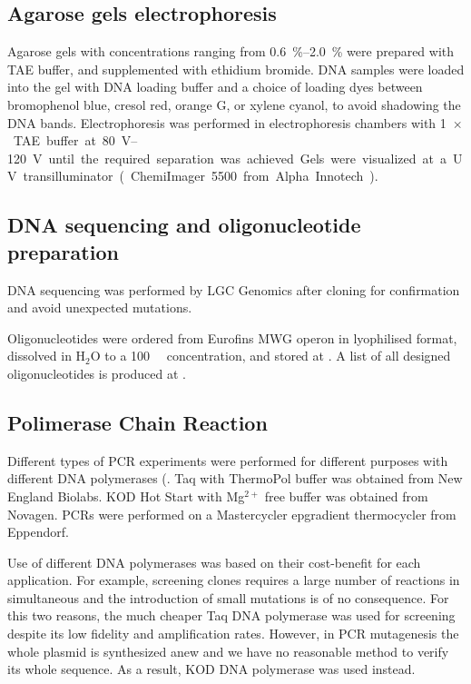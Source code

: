   \subsection{Agarose gels electrophoresis}
    Agarose gels with concentrations ranging from \SIrange{0.6}{2.0}{\percent} were prepared with TAE buffer,
    and supplemented with ethidium bromide. DNA samples were loaded into the gel with DNA loading buffer and a
    choice of loading dyes between bromophenol blue, cresol red, orange G, or xylene cyanol, to avoid shadowing
    the DNA bands. Electrophoresis was performed in electrophoresis chambers with \SI{1}{$\times$}~TAE buffer at
    \SIrange{80}{120}{\volt} until the required separation was achieved. Gels were visualized at a UV
    transilluminator (ChemiImager 5500 from Alpha Innotech).

  \subsection{DNA sequencing and oligonucleotide preparation}
    DNA sequencing was performed by LGC Genomics after cloning for confirmation and avoid unexpected mutations.
    
    Oligonucleotides were ordered from Eurofins MWG operon in lyophilised format, dissolved in H$_2$O to a
    \SI{100}{\micro\Molar} concentration, and stored at . A list of all designed oligonucleotides is
    produced at .

  \subsection{Polimerase Chain Reaction}
    Different types of PCR experiments were performed for different purposes with different DNA polymerases
    (. Taq with ThermoPol buffer was obtained from New England Biolabs. KOD Hot Start
    with Mg$^{2+}$ free buffer was obtained from Novagen. PCRs were performed on a Mastercycler epgradient
    thermocycler from Eppendorf.
    
    Use of different DNA polymerases was based on their cost-benefit for each application. For example, screening
    clones requires a large number of reactions in simultaneous and the introduction of small mutations is of no
    consequence. For this two reasons, the much cheaper Taq DNA polymerase was used for screening despite its
    low fidelity and amplification rates. However, in PCR mutagenesis the whole plasmid is synthesized anew and we
    have no reasonable method to verify its whole sequence. As a result, KOD DNA polymerase was used instead.
    
